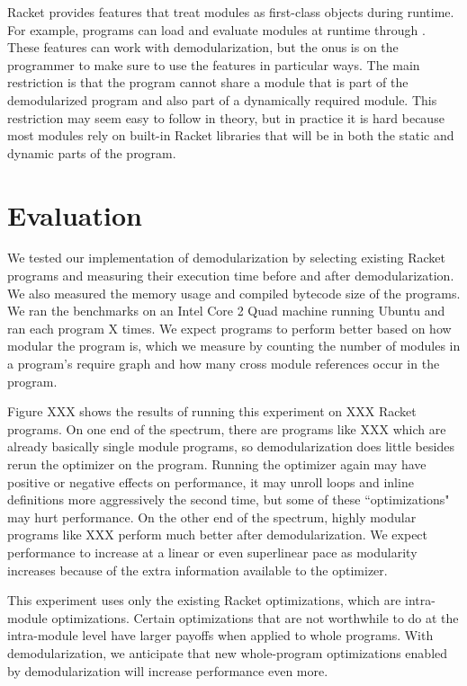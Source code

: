 \documentclass[ms,electronic,letterpaper,lol,lof,lot]{byumsphd}
\begin{document}
Racket provides features that treat modules as first-class objects during runtime. 
For example, programs can load and evaluate modules at runtime through . 
These features can work with demodularization, but the onus is on the programmer to make sure to use the features in particular ways.
The main restriction is that the program cannot share a module that is part of the demodularized program and also part of a dynamically required module. 
This restriction may seem easy to follow in theory, but in practice it is hard because most modules rely on built-in Racket libraries that will be in both the static and dynamic parts of the program.

\chapter{Evaluation}

We tested our implementation of demodularization by selecting existing Racket programs and measuring their execution time before and after demodularization.
We also measured the memory usage and compiled bytecode size of the programs.
We ran the benchmarks on an Intel Core 2 Quad machine running Ubuntu and ran each program X times.
We expect programs to perform better based on how modular the program is, which we measure by counting the number of modules in a program's require graph and how many cross module references occur in the program.

Figure XXX shows the results of running this experiment on XXX Racket programs. 
On one end of the spectrum, there are programs like XXX which are already basically single module programs, so demodularization does little besides rerun the optimizer on the program. Running the optimizer again may have positive or negative effects on performance, it may unroll loops and inline definitions more aggressively the second time, but some of these ``optimizations" may hurt performance.
On the other end of the spectrum, highly modular programs like XXX perform much better after demodularization.
We expect performance to increase at a linear or even superlinear pace as modularity increases because of the extra information available to the optimizer.

This experiment uses only the existing Racket optimizations, which are intra-module optimizations.
Certain optimizations that are not worthwhile to do at the intra-module level have larger payoffs when applied to whole programs. 
With demodularization, we anticipate that new whole-program optimizations enabled by demodularization will increase performance even more.
\end{document}
